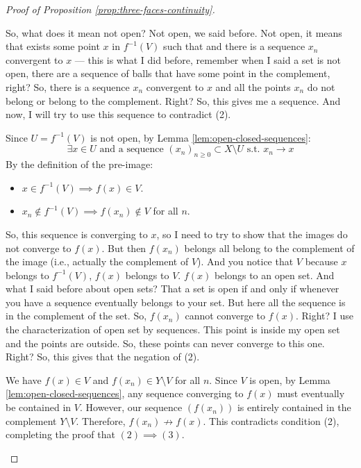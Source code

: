 \begin{proof}[Proof of Proposition \ref{prop:three-faces-continuity}]
\begin{spoken-clean}[00:26:13 - 00:28:12]
So, what does it mean not open? Not open, we said before. Not open, it means that exists some point $x$ in $f^{-1}(V)$ such that and there is a sequence $x_n$ convergent to $x$ --- this is what I did before, remember when I said a set is not open, there are a sequence of balls that have some point in the complement, right? So, there is a sequence $x_n$ convergent to $x$ and all the points $x_n$ do not belong or belong to the complement. Right? So, this gives me a sequence. And now, I will try to use this sequence to contradict (2).
\end{spoken-clean}

\begin{math-stroke}
Since $U = f^{-1}(V)$ is not open, by Lemma \ref{lem:open-closed-sequences}:
\[ \exists x \in U \text{ and a sequence } (x_n)_{n \ge 0} \subset X \setminus U \text{ s.t. } x_n \to x \]
By the definition of the pre-image:
\begin{itemize}
    \item $x \in f^{-1}(V) \implies f(x) \in V$.
    \item $x_n \notin f^{-1}(V) \implies f(x_n) \notin V$ for all $n$.
\end{itemize}
\end{math-stroke}

\begin{spoken-clean}[00:28:12 - 00:29:34]
So, this sequence is converging to $x$, so I need to try to show that the images do not converge to $f(x)$. But then $f(x_n)$ belongs all belong to the complement of the image (i.e., actually the complement of $V$). And you notice that $V$ because $x$ belongs to $f^{-1}(V)$, $f(x)$ belongs to $V$. $f(x)$ belongs to an open set. And what I said before about open sets? That a set is open if and only if whenever you have a sequence eventually belongs to your set. But here all the sequence is in the complement of the set. So, $f(x_n)$ cannot converge to $f(x)$. Right? I use the characterization of open set by sequences. This point is inside my open set and the points are outside. So, these points can never converge to this one. Right? So, this gives that the negation of (2).
\end{spoken-clean}

\begin{math-stroke}
We have $f(x) \in V$ and $f(x_n) \in Y \setminus V$ for all $n$.
Since $V$ is open, by Lemma \ref{lem:open-closed-sequences}, any sequence converging to $f(x)$ must eventually be contained in $V$.
However, our sequence $(f(x_n))$ is entirely contained in the complement $Y \setminus V$.
Therefore, $f(x_n) \not\to f(x)$.
This contradicts condition (2), completing the proof that $(2) \implies (3)$.
\end{math-stroke}
\end{proof}


